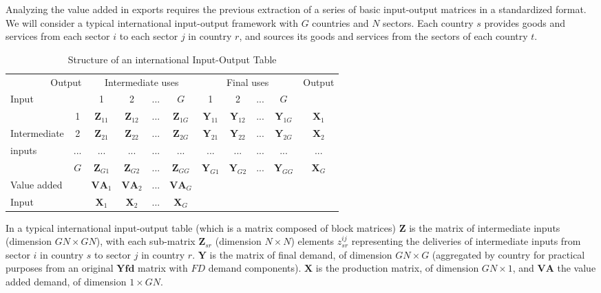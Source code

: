 Analyzing the value added in exports requires the previous extraction of a
series of basic input-output matrices in a standardized format. We will consider
a typical international input-output framework with \(G\) countries and \(N\)
sectors. Each country \(s\) provides goods and services from each sector \(i\) to
each sector \(j\) in country \(r\), and sources its goods and services from the
sectors of each country \(t\).

\begin{table}[h]
    \centering
    \caption{\label{tab:iot}Structure of an international Input-Output Table}
    \begin{tabular}{|lc|c|c|c|c|c|c|c|c|c|}
        \hline
        \multicolumn{2}{|r|}{Output}
        & \multicolumn{4}{|c|}{Intermediate uses}
        & \multicolumn{4}{|c|}{Final uses}
        & Output \\ \cline{3-10}
        \multicolumn{2}{|l|}{Input} & 1 & 2 & ... & $G$
        & 1 & 2 & ... & $G$ & ~ \\ \hline
        ~ & 1 & $\mathbf{Z}_{11}$ & $\mathbf{Z}_{12}$ & ... & $\mathbf{Z}_{1G}$ &
        $\mathbf{Y}_{11}$ & $\mathbf{Y}_{12}$ & ... & $\mathbf{Y}_{1G}$
        & $\mathbf{X}_{1}$ \\
        Intermediate & 2 &
        $\mathbf{Z}_{21}$ & $\mathbf{Z}_{22}$ & ... & $\mathbf{Z}_{2G}$ &
        $\mathbf{Y}_{21}$ & $\mathbf{Y}_{22}$ & ... & $\mathbf{Y}_{2G}$ &
        $\mathbf{X}_{2}$ \\
        inputs & ... & ... & ... & ... & ... & ... & ... & ... & ... & ... \\
        ~ & $G$ & $\mathbf{Z}_{G1}$ & $\mathbf{Z}_{G2}$ & ... & $\mathbf{Z}_{GG}$
        & $\mathbf{Y}_{G1}$ & $\mathbf{Y}_{G2}$ & ... & $\mathbf{Y}_{GG}$ &
        $\mathbf{X}_{G}$ \\ \hline
        Value added & ~ & $\mathbf{VA}_{1}$ & $\mathbf{VA}_{2}$ & ... &
        $\mathbf{VA}_{G}$ \\ \cline{1-6}
        Input & ~ & $\mathbf{X}_{1}$ & $\mathbf{X}_{2}$ & ...
        & $\mathbf{X}_{G}$  \\ \cline{1-6}
    \end{tabular}
\end{table}

In a typical international input-output table (which is a matrix composed of
block matrices) \(\mathbf{Z}\) is the matrix of intermediate inputs (dimension \(GN \times GN\)), with each sub-matrix \(\mathbf{Z}_{sr}\) (dimension \(N \times N\))
elements \(z_{sr}^{ij}\) representing the deliveries of intermediate inputs from
sector \(i\) in country \(s\) to sector \(j\) in country \(r\). \(\mathbf{Y}\) is the
matrix of final demand, of dimension \(GN \times G\) (aggregated by country for
practical purposes from an original \(\mathbf{Yfd}\) matrix with \(FD\) demand
components). \(\mathbf{X}\) is the production matrix, of dimension \(GN \times 1\),
and \(\mathbf{VA}\) the value added demand, of dimension \(1 \times GN\).


